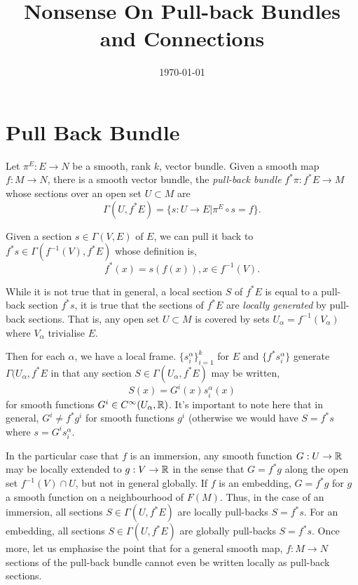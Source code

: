 \documentclass{amsart}
\begin{document}
\title[Nonsense]
 {Nonsense On Pull-back Bundles and Connections}

\curraddr{}
\email{}
\date{\today}

\dedicatory{}
\subjclass[2010]{}
\keywords{}

\maketitle

\section{Pull Back Bundle}

Let \(\pi^E : E \to N\) be a smooth, rank \(k\), vector bundle. Given a smooth map \(f : M \to N\), there is a smooth vector bundle, the \emph{pull-back bundle} \(f^{\ast} \pi : f^{\ast}E \to M\) whose sections over an open set \(U  \subset M\) are
\[
\Gamma(U, f^{\ast} E) = \{s : U \to E | \pi^E \circ s = f\}.
\]

Given a section \(s \in \Gamma(V, E)\) of \(E\), we can pull it back to \(f^{\ast} s \in \Gamma(f^{-1}(V), f^{\ast} E)\) whose definition is,
\[
f^{\ast} (x) = s(f(x)), x \in f^{-1}(V).
\]

While it is not true that in general, a local section \(S\) of \(f^{\ast} E\) is equal to a pull-back section \(f^{\ast} s\), it is true that the sections of \(f^{\ast} E\) are \emph{locally generated} by pull-back sections. That is, any open set \(U \subset M\) is covered by sets \(U_{\alpha} = f^{-1}(V_{\alpha})\) where \(V_{\alpha}\) trivialise \(E\).

Then for each \(\alpha\), we have a local frame. \(\{s^{\alpha}_i\}_{i=1}^k\) for \(E\) and \(\{f^{\ast} s^{\alpha}_i\}\) generate \(\Gamma(U_{\alpha}, f^{\ast} E\) in that any section \(S \in \Gamma(U_{\alpha}, f^{\ast} E)\) may be written,
\[
S(x) = G^i(x) s^{\alpha}_i(x)
\]
for smooth functions \(G^i \in C^{\infty}(U_{\alpha}, \mathbb{R})\). It's important to note here that in general, \(G^i \ne f^{\ast} g^i\) for smooth functions \(g^i\) (otherwise we would have \(S = f^{\ast} s\) where \(s = G^i s^{\alpha}_i\).

In the particular case that \(f\) is an immersion, any smooth function \(G : U \to \mathbb{R}\) may be locally extended to \(g : V \to \mathbb{R}\) in the sense that \(G = f^{\ast} g\) along the open set \(f^{-1}(V) \cap U\), but not in general globally. If \(f\) is an embedding, \(G = f^{\ast} g\) for \(g\) a smooth function on a neighbourhood of \(F(M)\). Thus, in the case of an immersion, all sections \(S \in \Gamma(U, f^{\ast} E)\) are locally pull-backs \(S = f^{\ast} s\). For an embedding, all sections \(S \in \Gamma(U, f^{\ast} E)\) are globally pull-backs \(S = f^{\ast} s\). Once more, let us emphasise the point that for a general smooth map, \(f: M \to N\) sections of the pull-back bundle cannot even be written locally as pull-back sections.
\end{document}

